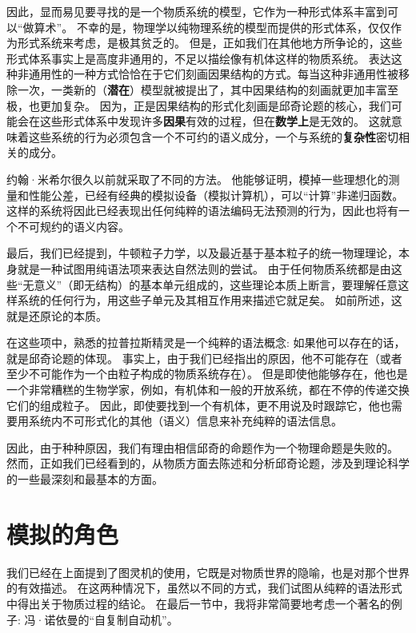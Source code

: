 \documentclass[a4paper,12pt]{article}
\begin{document}
因此，显而易见要寻找的是一个\gls{物质系统}的\gls{模型}，它作为一种形式体系丰富到可以“做算术”。
不幸的是，物理学以纯物理系统的\gls{模型}而提供的形式体系，仅仅作为\gls{形式系统}来考虑，是极其贫乏的。
但是，正如我们在其他地方所争论的，这些形式体系事实上是高度非通用的，不足以描绘像有机体这样的\gls{物质系统}\cite{RosenRinpress}。
表达这种非通用性的一种方式恰恰在于它们刻画\gls{因果结构}的方式。每当这种非通用性被移除一次，一类新的（\textbf{潜在}）\gls{模型}就被提出了，其中\gls{因果结构}的刻画就更加丰富至极，也更加复杂。
因为，正是\gls{因果结构}的\gls{形式化}刻画是\gls{邱奇论题}的核心，我们可能会在这些形式体系中发现许多\textbf{\gls{因果}}有效的过程，但在\textbf{数学上}是无效的。
这就意味着这些系统的行为必须包含一个不可约的\gls{语义成分}，一个与系统的\textbf{复杂性}密切相关的成分。

约翰·米希尔很久以前就采取了不同的方法\cite{MyhillJ1966}。
他能够证明，模掉一些理想化的\gls{测量}和性能公差，已经有经典的\gls{模拟设备}（\gls{模拟计算机}），可以“计算”非递归函数。
这样的系统将因此已经表现出任何纯粹的\gls{语法编码}无法\gls{预测}的行为，因此也将有一个不可规约的\gls{语义内容}。

最后，我们已经提到，牛顿粒子力学，以及最近基于基本粒子的统一物理理论，本身就是一种试图用纯\gls{语法项}来表达\gls{自然法则}的尝试。
由于任何\gls{物质系统}都是由这些“无意义”（即无结构）的基本单元组成的，这些理论本质上断言，要理解任意这样系统的任何行为，用这些子单元及其相互作用来描述它就足矣。
如前所述，这就是还原论的本质。

在这些项中，熟悉的拉普拉斯精灵是一个纯粹的\gls{语法}概念: 如果他可以存在的话，就是\gls{邱奇论题}的体现。
事实上，由于我们已经指出的原因，他不可能存在（或者至少不可能作为一个由粒子构成的\gls{物质系统}存在）。
但是即使他能够存在，他也是一个非常糟糕的生物学家，例如，有机体和一般的开放系统，都在不停的传递交换它们的组成粒子。
因此，即使要找到一个有机体，更不用说及时跟踪它，他也需要用系统内不可\gls{形式化}的其他（\gls{语义}）信息来补充纯粹的\gls{语法信息}。

因此，由于种种原因，我们有理由相信邱奇的命题作为一个物理命题是失败的。
然而，正如我们已经看到的，从\gls{物质}方面去陈述和分析\gls{邱奇论题}，涉及到理论科学的一些最深刻和最基本的方面。

\section{模拟的角色}

我们已经在上面提到了\gls{图灵机}的使用，它既是对\gls{物质世界}的隐喻，也是对那个世界的有效描述。
在这两种情况下，虽然以不同的方式，我们试图从纯粹的\gls{语法形式}中得出关于\gls{物质过程}的结论。
在最后一节中，我将非常简要地考虑一个著名的例子: 冯·诺依曼的“自复制自动机”\cite{BurksA1966}\cite{ArbibMA1988}。
\end{document}

